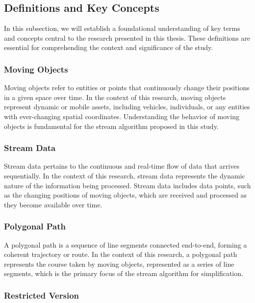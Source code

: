 \iffalse
\subsection{Definitions and Key Concepts}
In this subsection, we will establish a foundational understanding of key terms and concepts central to the research presented in this thesis. These definitions are essential for comprehending the context and significance of the study.

\subsubsection{Moving Objects}

Moving objects refer to entities or points that continuously change their positions in a given space over time. In the context of this research, moving objects represent dynamic or mobile assets, including vehicles, individuals, or any entities with ever-changing spatial coordinates. Understanding the behavior of moving objects is fundamental for the stream algorithm proposed in this study.

\subsubsection{Stream Data}

Stream data pertains to the continuous and real-time flow of data that arrives sequentially. In the context of this research, stream data represents the dynamic nature of the information being processed. Stream data includes data points, such as the changing positions of moving objects, which are received and processed as they become available over time.


\subsubsection{Polygonal Path}

A polygonal path is a sequence of line segments connected end-to-end, forming a coherent trajectory or route. In the context of this research, a polygonal path represents the course taken by moving objects, represented as a series of line segments, which is the primary focus of the stream algorithm for simplification.


\subsubsection{Restricted Version}

